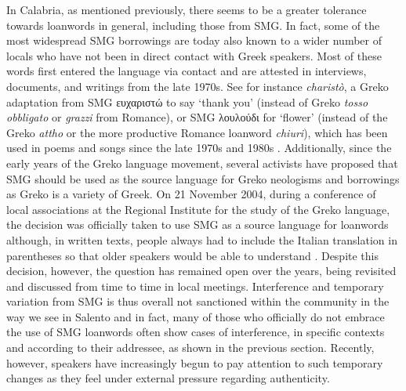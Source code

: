 \documentclass[output=paper,hidelinks]{langscibook}
\begin{document}
In Calabria, as mentioned previously, there seems to be a greater tolerance towards loanwords in general, including those from SMG. In fact, some of the most widespread SMG borrowings are today also known to a wider number of locals who have not been in direct contact with Greek speakers. Most of these words first entered the language via contact and are attested in interviews, documents, and writings from the late 1970s. See for instance \textit{charistò}, a Greko adaptation from SMG {ευχαριστώ} to say ‘thank you’ (instead of Greko \textit{tosso obbligato} or \textit{grazzi} from Romance), or SMG {λουλούδι} for ‘flower’ (instead of the Greko \textit{attho} or the more productive Romance loanword \textit{chiuri}), which has been used in poems and songs since the late 1970s and 1980s \citep{Squillaci2021}. Additionally, since the early years of the Greko language movement, several activists have proposed that SMG should be used as the source language for Greko neologisms and borrowings as Greko is a variety of Greek. On 21 November 2004, during a conference of local associations at the Regional Institute for the study of the Greko language, the decision was officially taken to use SMG as a source language for loanwords although, in written texts, people always had to include the Italian translation in parentheses so that older speakers would be able to understand \citep[10]{Condemi2006}. Despite this decision, however, the question has remained open over the years, being revisited and discussed from time to time in local meetings. Interference and temporary variation from SMG is thus overall not sanctioned within the community in the way we see in Salento and in fact, many of those who officially do not embrace the use of SMG loanwords often show cases of interference, in specific contexts and according to their addressee, as shown in the previous section. Recently, however, speakers have increasingly begun to pay attention to such temporary changes as they feel under external pressure regarding authenticity.
\end{document}

